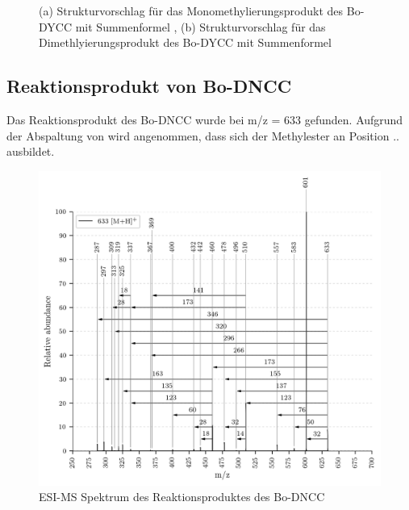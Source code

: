 \begin{figure}[!htbp]
\begin{subfigure}[b]{0.5\textwidth}
    \caption{}
    \label{fig:645MHStruktur}
  \end{subfigure}
  \caption[Strukturvorschläge für das Mono- und Dimethylierungsprodukt des Bo-DYCC, Quelle: Autor]{(a) Strukturvorschlag für das Monomethylierungsprodukt des Bo-DYCC mit Summenformel \ch{}, (b) Strukturvorschlag für das Dimethlyierungsprodukt des Bo-DYCC mit Summenformel \ch{}}
\end{figure}

\subsection{Reaktionsprodukt von Bo-DNCC}

Das Reaktionsprodukt des Bo-DNCC wurde bei m/z = 633 gefunden. Aufgrund der Abspaltung von  wird angenommen, dass sich der Methylester an Position .. ausbildet.

\begin{figure}[!htbp]
  \centering
  \includegraphics[width=\textwidth, height=0.7\textwidth]{figures/Kapitel7/Kataboliten/VWA_MS_633.png}
  \caption[ESI-MS Spektrum des Reaktionsproduktes von Bo-DNCC, Quelle: Autor]{ESI-MS Spektrum des Reaktionsproduktes des Bo-DNCC}
  \label{fig:633MH}
\end{figure}

